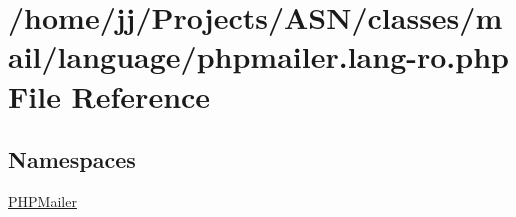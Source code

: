 \hypertarget{phpmailer_8lang-ro_8php}{}\section{/home/jj/\+Projects/\+A\+S\+N/classes/mail/language/phpmailer.lang-\/ro.php File Reference}
\label{phpmailer_8lang-ro_8php}
\subsection*{Namespaces}
\begin{DoxyCompactItemize}
\item 
 \hyperlink{namespace_p_h_p_mailer}{P\+H\+P\+Mailer}
\end{DoxyCompactItemize}
